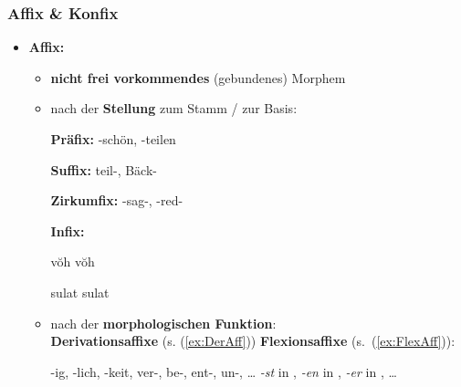 \begin{frame}
\frametitle{Affix \& Konfix}

\begin{itemize}
	\item \textbf{Affix:}
	
	\begin{itemize}
		\item \textbf{nicht frei vorkommendes} (gebundenes) Morphem
		
		\item nach der \textbf{Stellung} zum Stamm / zur Basis:
		
		\settowidth{} 
		\ea
			\ea \textbf{Präfix:} -schön, -teilen
		
			\ex \textbf{Suffix:} teil-, Bäck-
		
			\ex \textbf{Zirkumfix:} -sag-, -red-
		
			\ex \textbf{Infix:} 
			
			 v\u{o}h  \ras v\u{o}h  
			 
			sulat  \ras sulat  
		
			\z 
		\z 

\pause 
		
		\item nach der \textbf{morphologischen Funktion}: \\
		\textbf{Derivationsaffixe} (s. (\ref{ex:DerAff})) \vs \textbf{Flexionsaffixe} (s.\ (\ref{ex:FlexAff})):
		
		\ea 
		\ea\label{ex:DerAff} -ig, -lich, -keit, ver-, be-, ent-, un-, \dots
		\ex\label{ex:FlexAff} \emph{-st} in , \emph{-en} in , \emph{-er} in , \dots
		\z
		\z 
	\end{itemize}
\end{itemize}
\end{frame}


